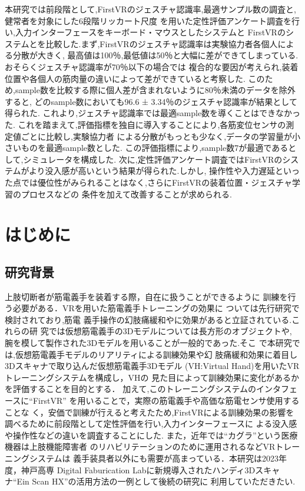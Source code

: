 \documentclass{ltjsreport}
\begin{document}
本研究では前段階として,FirstVRのジェスチャ認識率,最適サンプル数の調査と,健常者を対象にした6段階リッカート尺度
を用いた定性評価アンケート調査を行い,入力インターフェースをキーボード・マウスとしたシステムと
FirstVRのシステムとを比較した.まず,FirstVRのジェスチャ認識率は実験協力者各個人による分散が大きく,
最高値は100％,最低値は50％と大幅に差ができてしまっている.おそらくジェスチャ認識率が70％以下の場合では
複合的な要因が考えられ,装着位置や各個人の筋肉量の違いによって差ができていると考察した.
このため,sample数を比較する際に個人差が含まれないように80％未満のデータを除外すると,
どのsample数においても96.6 ± 3.34％のジェスチャ認識率が結果として得られた.
これより,ジェスチャ認識率では最適sample数を導くことはできなかった.
これを踏まえて,評価指標を独自に導入することにより,各筋変位センサの測定値ごとに比較し,実験協力者
による分散がもっとも少なく,データの学習量が小さいものを最適sample数とした.
この評価指標により,sample数7が最適であるとして,シミュレータを構成した.
次に,定性評価アンケート調査ではFirstVRのシステムがより没入感が高いという結果が得られた.しかし,
操作性や入力遅延といった点では優位性がみられることはなく,さらにFirstVRの装着位置・ジェスチャ学習のプロセスなどの
条件を加えて改善することが求められる.
\clearpage

\setcounter{tocdepth}{2}
\tableofcontents

\clearpage


\chapter{はじめに}
	\section{研究背景}
	上肢切断者が筋電義手を装着する際，自在に扱うことができるように
	訓練を行う必要がある．VRを用いた筋電義手トレーニングの効果に
	ついては先行研究\cite{ref:1}\cite{ref:2}で検討されており,筋電
	義手操作の幻肢痛緩和やに効果があると立証されている.これらの研
	究では仮想筋電義手の3Dモデルについては長方形のオブジェクトや,
	腕を模して製作された3Dモデルを用いることが一般的であった.そこ
	で本研究では,仮想筋電義手モデルのリアリティによる訓練効果や幻
	肢痛緩和効果に着目し3Dスキャナで取り込んだ仮想筋電義手3Dモデル
	(VH:Virtual Hand)を用いたVRトレーニングシステムを構成し，VHの
	見た目によって訓練効果に変化があるかを評価することを目的とする．
	加えて,このトレーニングシステムのインタフェースに``FirstVR''\cite{ref:3}
	を用いることで，実際の筋電義手や高価な筋電センサ使用することな
	く，安価で訓練が行えると考えたため,FirstVRによる訓練効果の影響を
	調べるために前段階として定性評価を行い,入力インターフェースに
	よる没入感や操作性などの違いを調査することにした.
	また，近年では``カグラ''\cite{ref:4}という医療機器は上肢機能障害者
	のリハビリテーションのために運用されるなどVRトレーニングシステムは
	義手装具者以外にも需要が高まっている．本研究は2023年度，神戸高専
	Digital Faburication Labに新規導入されたハンディ3Dスキャナ``Ein Scan HX''\cite{ref:5}の活用方法の一例として後続の研究に
	利用していただきたい.
\end{document}
